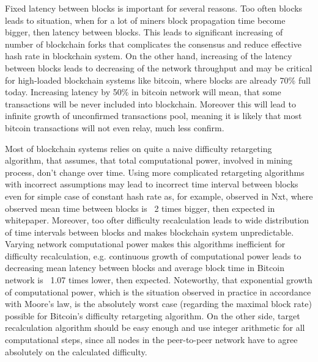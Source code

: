 \documentclass[number,preprint,review]{elsarticle}
\begin{document}
Fixed latency between blocks is important for several reasons.
Too often blocks leads to situation, when for a lot of miners block propagation time become bigger, then latency between blocks.
This leads to significant increasing of number of blockchain forks that complicates the consensus\cite{decker2013information} and reduce effective hash rate in blockchain system.
On the other hand, increasing of the latency between blocks leads to decreasing of the network throughput\cite{miller2016} and may be critical for high-loaded blockchain systems like bitcoin, where blocks are already 70\% full today\cite{armstrong2016}.
Increasing latency by 50\% in bitcoin network will mean, that some transactions will be never included into blockchain.
Moreover this will lead to infinite growth of unconfirmed transactions pool, meaning it is likely that most bitcoin transactions will not even relay, much less confirm.

Most of blockchain systems relies on quite a naive difficulty retargeting algorithm, that assumes, that total computational power, involved in mining process, don't change over time.
Using more complicated retargeting algorithms with incorrect assumptions\cite{andruiman2014} may lead to incorrect time interval between blocks even for simple case of constant hash rate as, for example, observed in Nxt, where observed mean time between blocks is ~2 times bigger, then expected in whitepaper\cite{nxt}. Moreover, too ofter difficulty recalculation leads to wide distribution of time intervals between blocks and makes blockchain system unpredictable\cite{andruiman2014}.
Varying network computational power makes this algorithms inefficient for difficulty recalculation, e.g. continuous growth of computational power leads to decreasing mean latency between blocks and average block time in Bitcoin network is ~1.07 times lower, then expected.
Noteworthy, that exponential growth of computational power, which is the situation observed in practice in accordance with Moore’s law\cite{moore2006cramming}, is the absolutely worst case (regarding the maximal block rate) possible for Bitcoin’s difficulty retargeting algorithm\cite{kraft2015difficulty}.
On the other side, target recalculation algorithm should be easy enough and use integer arithmetic for all computational steps, since all nodes in the peer-to-peer network have to agree absolutely on the calculated difficulty.
\end{document}
